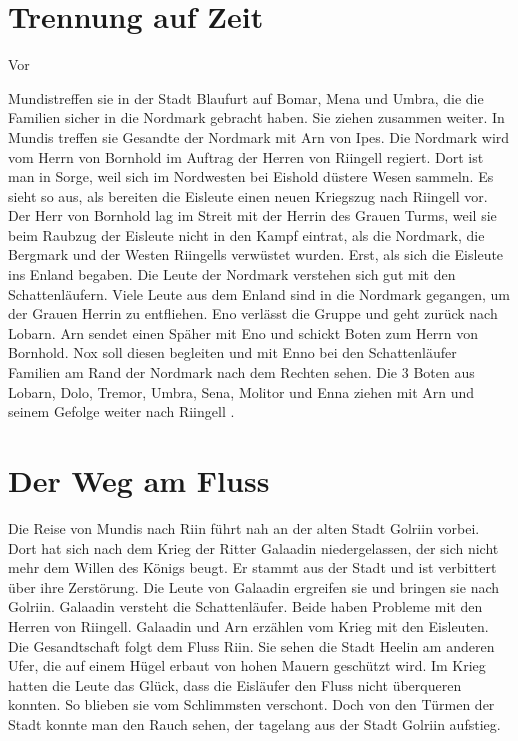 \documentclass[12pt,a4paper,onecolumn,twoside,ngerman]{book}
\newcommand{\Molitor}{Molitor}
\newcommand{\Sena}{Sena}
\newcommand{\Enland}{Enland}
\newcommand{\Schattenlaufer}{Schattenläufer}
\newcommand{\Eno}{Eno}
\newcommand{\Bomar}{Bomar}
\newcommand{\Dolo}{Dolo}
\newcommand{\Nox}{Nox}
\newcommand{\Mena}{Mena}
\newcommand{\Umbra}{Umbra}
\newcommand{\Enna}{Enna}
\newcommand{\Enno}{Enno}
\newcommand{\Tremor}{Tremor}
\newcommand{\Lobarn}{Lobarn}
\newcommand{\Nordmark}{Nordmark}
\newcommand{\Bergmark}{Bergmark}
\newcommand{\Ipes}{Ipes}
\newcommand{\Bornhold}{Bornhold}
\newcommand{\Eishold}{Eishold}
\newcommand{\Arn}{Arn}
\newcommand{\Eislaufer}{Eisläufer}
\newcommand{\Eisleute}{Eisleute}
\newcommand{\Rhingell}{Riingell}
\newcommand{\Blaufurt}{Blaufurt}
\newcommand{\Mundis}{Mundis}
\newcommand{\Helin}{Heelin}
\newcommand{\Golrin}{Golriin}
\newcommand{\Galadin}{Galaadin}
\newcommand{\Rhin}{Riin}
\begin{document}

\section{Trennung auf Zeit}
Vor {\Mundis  treffen sie in der Stadt {\Blaufurt}  auf {\Bomar}, {\Mena} und {\Umbra}, die die Familien sicher in die {\Nordmark} gebracht haben. Sie ziehen zusammen weiter. In {\Mundis} treffen sie Gesandte der {\Nordmark} mit {\Arn} von {\Ipes}. Die {\Nordmark} wird vom Herrn von {\Bornhold} im Auftrag der Herren von {\Rhingell} regiert. Dort ist man in Sorge, weil sich im Nordwesten bei {\Eishold} düstere Wesen sammeln. Es sieht so aus, als bereiten die {\Eisleute} einen neuen Kriegszug nach {\Rhingell} vor.\linebreak
Der Herr von {\Bornhold} lag im Streit mit der Herrin des Grauen Turms, weil sie beim Raubzug der {\Eisleute}  nicht in den Kampf eintrat, als die {\Nordmark}, die {\Bergmark} und der Westen {\Rhingell}s verwüstet wurden. Erst, als sich die {\Eisleute} ins {\Enland} begaben.\linebreak
Die Leute der {\Nordmark} verstehen sich gut mit den {\Schattenlaufer}n. Viele Leute aus dem {\Enland} sind in die {\Nordmark} gegangen, um der Grauen Herrin zu entfliehen.\linebreak
{\Eno} verlässt die Gruppe und geht zurück nach {\Lobarn}. {\Arn} sendet einen Späher mit {\Eno} und schickt  Boten zum Herrn von {\Bornhold}. {\Nox} soll diesen begleiten und mit {\Enno} bei den {\Schattenlaufer}    Familien am Rand der {\Nordmark} nach dem Rechten sehen. Die 3 Boten aus {\Lobarn}, {\Dolo}, {\Tremor}, {\Umbra}, {\Sena}, {\Molitor} und {\Enna} ziehen mit {\Arn} und seinem Gefolge weiter nach {\Rhingell} . 

\section{Der Weg am Fluss}
Die Reise von {\Mundis}  nach {\Rhin} führt nah an der alten Stadt {\Golrin} vorbei.\linebreak
Dort hat sich nach dem Krieg der Ritter {\Galadin} niedergelassen, der sich nicht mehr dem Willen des Königs beugt. Er stammt aus der Stadt und ist verbittert über ihre Zerstörung.\linebreak
Die Leute von {\Galadin}  ergreifen sie und bringen sie nach {\Golrin}. {\Galadin} versteht die {\Schattenlaufer}. Beide haben Probleme mit den Herren von {\Rhingell}. {\Galadin} und {\Arn} erzählen vom Krieg mit den Eisleuten.\linebreak 
Die Gesandtschaft folgt dem Fluss {\Rhin}. Sie sehen die Stadt {\Helin} am anderen Ufer, die auf einem Hügel erbaut von hohen Mauern geschützt wird. Im Krieg hatten die Leute das Glück, dass die {\Eislaufer} den Fluss nicht überqueren konnten. So blieben sie vom Schlimmsten verschont. Doch von den Türmen der Stadt konnte man den Rauch sehen, der tagelang aus der Stadt {\Golrin} aufstieg. 

}
\end{document}
